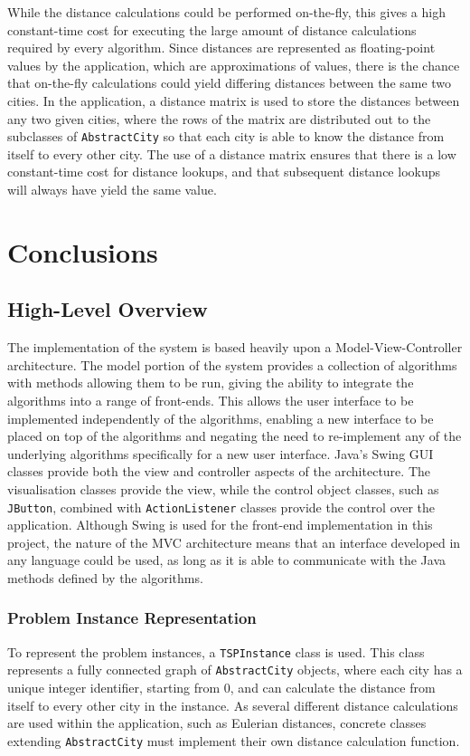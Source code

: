 \documentclass{l4proj}
\begin{document}
While the distance calculations could be performed on-the-fly, this gives a high constant-time cost for executing the large amount 
of distance calculations required by every algorithm. Since distances are represented as floating-point values by the application, 
which are approximations of values, there is the chance that on-the-fly calculations could yield differing distances between the same 
two cities. In the application, a distance matrix is used to store the distances between any two given cities, where the rows of the 
matrix are distributed out to the subclasses of \texttt{AbstractCity} so that each city is able to know the distance from itself to 
every other city. The use of a distance matrix ensures that there is a low constant-time cost for distance lookups, and that subsequent 
distance lookups will always have yield the same value.


\chapter{Conclusions}
\label{conclusions}

\section{High-Level Overview}
The implementation of the system is based heavily upon a Model-View-Controller architecture. The model portion of the system provides 
a collection of algorithms with methods allowing them to be run, giving the ability to integrate the algorithms into a range of front-ends. 
This allows the user interface to be implemented independently of the algorithms, enabling a new interface to be placed on top of the algorithms 
and negating the need to re-implement any of the underlying algorithms specifically for a new user interface. Java's Swing GUI classes 
provide both the view and controller aspects of the architecture. The visualisation classes provide the view, while the control object classes, 
such as \texttt{JButton}, combined with \texttt{ActionListener} classes provide the control over the application. Although Swing is used for 
the front-end implementation in this project, the nature of the MVC architecture means that an interface developed in any language could be 
used, as long as it is able to communicate with the Java methods defined by the algorithms.

\subsection{Problem Instance Representation}
To represent the problem instances, a \texttt{TSPInstance} class is used. This class represents a fully connected graph 
of \texttt{AbstractCity} objects, where each city has a unique integer identifier, starting from 0, and can calculate the 
distance from itself to every other city in the instance. As several different distance calculations are used within the 
application, such as Eulerian distances, concrete classes extending \texttt{AbstractCity} must implement their own distance calculation function.
\end{document}
